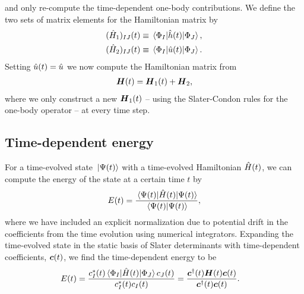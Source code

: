             and only re-compute the time-dependent one-body contributions.
            We define the two sets of matrix elements for the Hamiltonian matrix
            by
            \begin{gather}
                (\hat{H}_1)_{IJ}(t)
                \equiv
                \mel*{\Phi_I}{\hat{h}(t)}{\Phi_J}, \\
                (\hat{H}_2)_{IJ}(t)
                \equiv
                \mel*{\Phi_I}{\hat{u}(t)}{\Phi_J}.
            \end{gather}
            Setting $\hat{u}(t) = \hat{u}$ we now compute the Hamiltonian
            matrix from
            \begin{align}
                \boldsymbol{H}(t)
                = \boldsymbol{H}_1(t) + \boldsymbol{H}_2,
            \end{align}
            where we only construct a new $\boldsymbol{H}_1(t)$ -- using the
            Slater-Condon rules for the one-body operator -- at every time step.

        \subsection{Time-dependent energy}
            For a time-evolved state $\ket*{\Psi(t)}$ with a time-evolved
            Hamiltonian $\hat{H}(t)$, we can compute the energy of the state at a
            certain time $t$ by
            \begin{align}
                E(t) = \frac{
                    \mel*{\Psi(t)}{\hat{H}(t)}{\Psi(t)}
                }{
                    \braket*{\Psi(t)}
                },
            \end{align}
            where we have included an explicit normalization due to potential
            drift in the coefficients from the time evolution using numerical
            integrators.
            Expanding the time-evolved state in the static basis of Slater
            determinants with time-dependent coefficients, $\boldsymbol{c}(t)$, we find
            the time-dependent energy to be
            \begin{align}
                E(t)
                &=
                \frac{
                    c^{*}_I(t)\mel*{\Phi_I}{\hat{H}(t)}{\Phi_J}c_J(t)
                }{
                    c^{*}_I(t)c_I(t)
                }
                = \frac{
                    \boldsymbol{c}^{\dagger}(t)\boldsymbol{H}(t)\boldsymbol{c}(t)
                }{
                    \boldsymbol{c}^{\dagger}(t)\boldsymbol{c}(t)
                }.
            \end{align}


